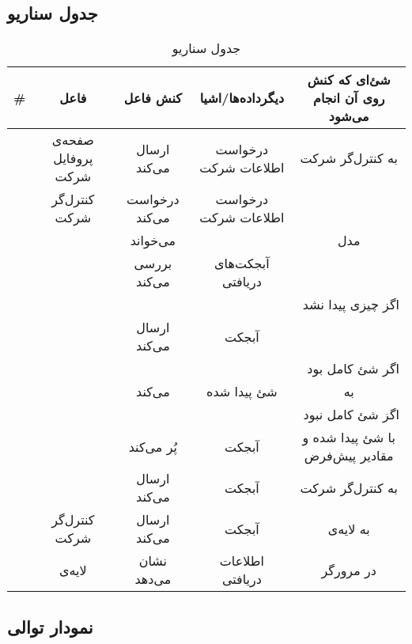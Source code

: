 \subsection{جدول سناریو}
\begin{table}[H]
	\caption{جدول سناریو }
	\begin{adjustbox}{width=\textwidth}
		\begin{tabular}{|c|c|c|c|c|}
			\hline								
			\# & فاعل & کنش فاعل & دیگرداده‌ها/اشیا & شئ‌ای که کنش روی آن انجام می‌شود \\
			\hline
			\sstep &
			صفحه‌ی پروفایل شرکت & 
			ارسال می‌کند & 
			درخواست اطلاعات شرکت & 
			به کنترل‌گر شرکت \\ 
			\hline
			\sstep &
			کنترل‌گر شرکت & 
			درخواست می‌کند & 
			درخواست اطلاعات شرکت & 
			\gdm \\ 
			\hline
			\sstep &
			\gdm & 
			می‌خواند & 
			& 
			مدل \lr{Company}\\ 
			\hline
			\sstep &
			\gdm & 
			بررسی می‌کند & 
			آبجکت‌های دریافتی & 
			\\ 
			\hline
			\sstep &
			\multicolumn{4}{|r|}{اگز چیزی پیدا نشد}\\ 
			\hline
			\sstep &
			\gdm & 
			ارسال می‌کند & 
			آبجکت \none & 
			\\ 
			\hline
			\sstep &
			\multicolumn{4}{|r|}{اگر شئ کامل بود}\\ 
			\hline
			\sstep &
			\gdm & 
			\serialize می‌کند & 
			شئ پیدا شده & 
			به \json  \\ 
			\hline
			\sstep &
			\multicolumn{4}{|r|}{اگز شئ کامل نبود}\\ 
			\hline
			\sstep &
			\gdm & 
			پُر می‌کند & 
			آبجکت \json & 
			با شئ پیدا شده و مقادیر پیش‌فرض\\ 
			\hline
			\sstep &
			\gdm & 
			ارسال می‌کند & 
			آبجکت \json & 
			به کنترل‌گر شرکت \\ 
			\hline
			\sstep &
			کنترل‌گر شرکت & 
			ارسال می‌کند & 
			آبجکت \json & 
			به لایه‌ی \frontend\\ 
			\hline
			\sstep &
			لایه‌ی \frontend& 
			نشان می‌دهد& 
			اطلاعات دریافتی & 
			در مرورگر \\ 
			\hline
		\end{tabular}
	\end{adjustbox}
\end{table}
\setcounter{MainStepCounter}{0}
\setcounter{SenarioCounter}{0}
\subsection{نمودار توالی}


